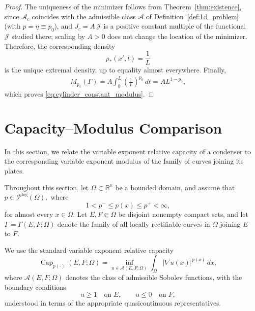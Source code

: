 \documentclass[12pt]{amsart}
\numberwithin{equation}{section}
\theoremstyle{plain}
\theoremstyle{definition}
\begin{document}
\begin{proof}
The uniqueness of the minimizer follows from Theorem~\ref{thm:existence}, since
$\mathcal A_c$ coincides with the admissible class $\mathcal A$ of
Definition~\ref{def:1d_problem} (with $p=\eta\equiv p_0$), and $J_c=A\,\mathcal J$
is a positive constant multiple of the functional $\mathcal J$ studied there;
scaling by $A>0$ does not change the location of the minimizer. Therefore, the corresponding density
\begin{equation*}
\rho_*(x',t)=\frac1L
\end{equation*}
is the unique extremal density, up to equality almost everywhere.
Finally,
\begin{align}
M_{p_0}(\Gamma)
=
A\int_0^L
\left(\frac1L\right)^{p_0}\,dt
=
A L^{1-p_0},
\end{align}
which proves \eqref{eq:cylinder_constant_modulus}.
\end{proof}


\section{Capacity--Modulus Comparison}
\label{sec:capacity}

In this section, we relate the variable exponent relative capacity of a
condenser to the corresponding variable exponent modulus of the family of
curves joining its plates.

Throughout this section, let $\Omega\subset\mathbb{R}^{n}$ be a bounded
domain, and assume that $p\in\mathcal P^{\log}(\Omega),$ where
\begin{equation*}
1<p^-\le p(x)\le p^+<\infty,
\end{equation*}
for almost every $x\in\Omega$.
Let $E,F\Subset\Omega$ be disjoint nonempty compact sets, and let
$\Gamma=\Gamma(E,F;\Omega)$
denote the family of all locally rectifiable curves in $\Omega$ joining
$E$ to $F$.

We use the standard variable exponent relative capacity
\begin{equation*}
\operatorname{Cap}_{p(\cdot)}(E,F;\Omega)
=
\inf_{u\in\mathcal A(E,F;\Omega)}
\int_\Omega |\nabla u(x)|^{p(x)}\,dx,
\end{equation*}
where $\mathcal A(E,F;\Omega)$ denotes the class of admissible
Sobolev functions, with the boundary conditions
\begin{equation*}
u\ge1\quad\text{on }E,
\qquad
u\le0\quad\text{on }F,
\end{equation*}
understood in terms of the appropriate quasicontinuous representatives.
\end{document}
